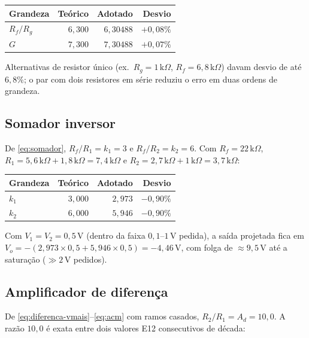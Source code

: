 \documentclass[11pt,a4paper]{article}
\begin{document}
\begin{center}
\begin{tabular}{@{}lrrr@{}}
\toprule
\textbf{Grandeza} & \textbf{Teórico} & \textbf{Adotado} & \textbf{Desvio} \\
\midrule
$R_f/R_g$ & $6{,}300$ & $6{,}30488$ & $+0{,}08\%$ \\
$G$ & $7{,}300$ & $7{,}30488$ & $+0{,}07\%$ \\
\bottomrule
\end{tabular}
\end{center}

Alternativas de resistor único (ex.\ $R_g=1\,\text{k}\Omega$, $R_f=6{,}8\,\text{k}\Omega$) davam
desvio de até $6{,}8\%$; o par com dois resistores em série reduziu o erro em duas ordens de
grandeza.

\subsection{Somador inversor}

De \eqref{eq:somador}, $R_f/R_1=k_1=3$ e $R_f/R_2=k_2=6$. Com
$R_f=22\,\text{k}\Omega$, $R_1=5{,}6\,\text{k}\Omega+1{,}8\,\text{k}\Omega=7{,}4\,\text{k}\Omega$
e $R_2=2{,}7\,\text{k}\Omega+1\,\text{k}\Omega=3{,}7\,\text{k}\Omega$:

\begin{center}
\begin{tabular}{@{}lrrr@{}}
\toprule
\textbf{Grandeza} & \textbf{Teórico} & \textbf{Adotado} & \textbf{Desvio} \\
\midrule
$k_1$ & $3{,}000$ & $2{,}973$ & $-0{,}90\%$ \\
$k_2$ & $6{,}000$ & $5{,}946$ & $-0{,}90\%$ \\
\bottomrule
\end{tabular}
\end{center}

Com $V_1=V_2=0{,}5\,\text{V}$ (dentro da faixa $0{,}1$–$1\,\text{V}$ pedida), a saída projetada
fica em $V_o=-(2{,}973\times0{,}5+5{,}946\times0{,}5)=-4{,}46\,\text{V}$, com folga de
${\approx}9{,}5\,\text{V}$ até a saturação (${\gg}2\,\text{V}$ pedidos).

\subsection{Amplificador de diferença}

De \eqref{eq:diferenca-vmais}--\eqref{eq:acm} com ramos casados, $R_2/R_1=A_d=10{,}0$. A razão
$10{,}0$ é exata entre dois valores E12 consecutivos de década:
\end{document}
